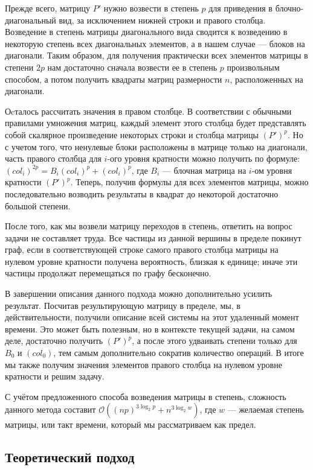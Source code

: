 Прежде всего, матрицу $P'$ нужно возвести в степень $p$ для приведения в блочно-диагональный вид, за исключением нижней строки и правого столбца. Возведение в степень матрицы диагонального вида сводится к возведению в некоторую степень всех диагональных элементов, а в нашем случае --- блоков на диагонали. Таким образом, для получения практически всех элементов матрицы в степени $2p$ нам достаточно сначала возвести ее в степень $p$ произвольным способом, а потом получить квадраты матриц размерности $n$, расположенных на диагонали. 

Оcталось рассчитать значения в правом столбце. В соответствии с обычными правилами умножения матриц, каждый элемент этого столбца будет представлять собой скалярное произведение некоторых строки и столбца матрицы $(P')^p$. Но с учетом того, что ненулевые блоки расположены в матрице только на диагонали, часть правого столбца для $i$-ого уровня кратности можно получить по формуле: $(col_i)^{2p} = B_i(col_i)^{p} + (col_i)^{p}$, где $B_i$ --- блочная матрица на $i$-ом уровня кратности $(P')^p$. Теперь, получив формулы для всех элементов матрицы, можно последовательно возводить результаты в квадрат до некоторой достаточно большой степени.

После того, как мы возвели матрицу переходов в степень, ответить на вопрос задачи не составляет труда. Все частицы из данной вершины в пределе покинут граф, если в соответствующей строке самого правого столбца матрицы на нулевом уровне кратности получена вероятность, близкая к единице; иначе эти частицы продолжат перемещаться по графу бесконечно. 

В завершении описания данного подхода можно дополнительно усилить результат. Посчитав результирующую матрицу в пределе, мы, в действительности, получили описание всей системы на этот удаленный момент времени. Это может быть полезным, но в контексте текущей задачи, на самом деле, достаточно получить $(P')^p$, а после этого удваивать степени только для $B_0$ и $(col_0)$, тем самым дополнительно сократив количество операций. В итоге мы также получим значения элементов правого столбца на нулевом уровне кратности и решим задачу. 

С учётом предложенного способа возведения матрицы в степень, сложность данного метода составит $\mathcal{O}((np)^{3 \log_2 p} + n^{3 \log_2 w})$, где $w$ --- желаемая степень матрицы, или такт времени, который мы рассматриваем как предел.

\subsection{Теоретический подход}

